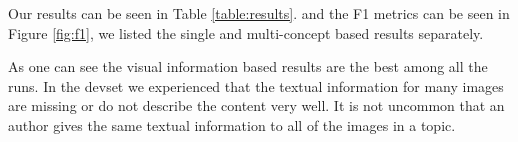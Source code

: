 \documentclass{sig-alternate}
\begin{document}
Our results can be seen in Table \ref{table:results}. and the F1 metrics can be seen in Figure \ref{fig:f1}, we listed the single and multi-concept based results separately. 

As one can see the visual information based results are the best among all the runs. In the devset we experienced that the textual information for many images are missing or do not describe the content very well. It is not uncommon that an author gives the same textual information to all of the images in a topic.



\end{document}
